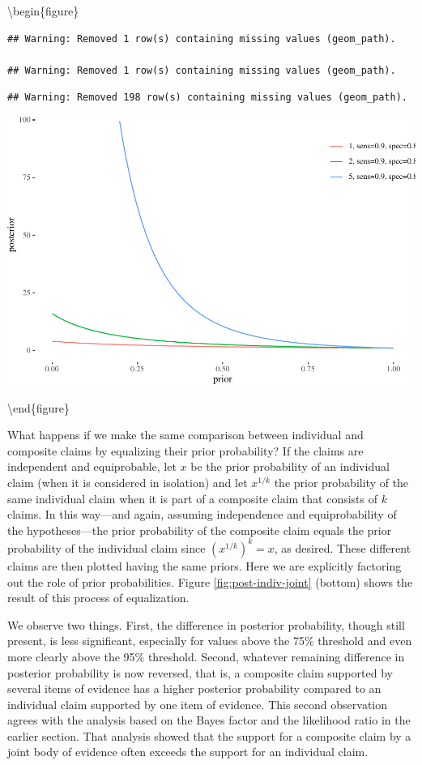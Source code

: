 \documentclass[
  10pt,
  dvipsnames,enabledeprecatedfontcommands]{scrartcl}
\begin{document}
\textbackslash begin\{figure\}

\begin{verbatim}
## Warning: Removed 1 row(s) containing missing values (geom_path).

## Warning: Removed 1 row(s) containing missing values (geom_path).
\end{verbatim}

\begin{verbatim}
## Warning: Removed 198 row(s) containing missing values (geom_path).
\end{verbatim}

\begin{center}\includegraphics[width=0.9\linewidth]{conjunction-paradox_files/figure-latex/unnamed-chunk-11-1} \end{center}

\textbackslash end\{figure\}

What happens if we make the same comparison between individual and
composite claims by equalizing their prior probability? If the claims
are independent and equiprobable, let \(x\) be the prior probability of
an individual claim (when it is considered in isolation) and let
\(x^{1/k}\) the prior probability of the same individual claim when it
is part of a composite claim that consists of \(k\) claims. In this
way---and again, assuming independence and equiprobability of the
hypotheses---the prior probability of the composite claim equals the
prior probability of the individual claim since \((x^{1/k})^k=x\), as
desired. These different claims are then plotted having the same priors.
Here we are explicitly factoring out the role of prior probabilities.
Figure \ref{fig:post-indiv-joint} (bottom) shows the result of this
process of equalization.

We observe two things. First, the difference in posterior probability,
though still present, is less significant, especially for values above
the 75\% threshold and even more clearly above the 95\% threshold.
Second, whatever remaining difference in posterior probability is now
reversed, that is, a composite claim supported by several items of
evidence has a higher posterior probability compared to an individual
claim supported by one item of evidence. This second observation agrees
with the analysis based on the Bayes factor and the likelihood ratio in
the earlier section. That analysis showed that the support for a
composite claim by a joint body of evidence often exceeds the support
for an individual claim.
\end{document}
